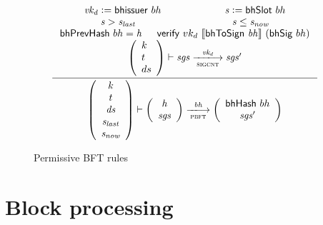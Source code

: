 \documentclass[11pt,a4paper]{article}
\newcommand{\var}[1]{\mathit{#1}}
\newcommand{\fun}[1]{\mathsf{#1}}
\newcommand{\type}[1]{\mathsf{#1}}
\newcommand{\trans}[2]{\xlongrightarrow[\textsc{#1}]{#2}}
\newcommand{\serialised}[1]{\llbracket \var{#1} \rrbracket}
\newcommand{\leteq}{\ensuremath{\mathrel{\mathop:}=}}
\newcommand{\verifyname}{verify}
\newcommand{\bhsigname}{bhSig}
\newcommand{\bhissuername}{bhissuer}
\newcommand{\verify}[3]{\fun{\verifyname} ~ #1 ~ #2 ~ #3}
\newcommand{\bhsig}[1]{\fun{\bhsigname} ~ #1}
\newcommand{\bhissuer}[1]{\fun{\bhissuername} ~ #1}
\begin{document}
\begin{figure}[ht]
  \begin{equation*}
    \inference
    {
      \var{vk_d} \leteq \bhissuer{bh} & \var{s} \leteq \bhslot{bh}
      \\ \var{s} > \var{s_{last}} & \var{s} \leq \var{s_{now}}
      \\ \bhprevhash{bh} = \var{h} & \verify{vk_d}{\serialised{\bhtosign{bh}}}{(\bhsig{bh})}
      \\
      {\left(
          \begin{array}{l}
            k\\
            t\\
            ds
          \end{array}
        \right)}
      \vdash
      \var{sgs} \trans{sigcnt}{\var{vk_d}} \var{sgs'}
      \\
    }
    {
      \left(
        {\begin{array}{c}
           k\\
           t\\
           \var{ds} \\
           \var{s_{last}} \\
           \var{s_{now}} \\
         \end{array}}
     \right)
     \vdash
     \left(
       {\begin{array}{c}
          \var{h} \\
          \var{sgs}
        \end{array}}
    \right)
    \trans{pbft}{\var{bh}}
    \left(
      {\begin{array}{c}
         \bhhash{bh} \\
         \var{sgs}'
       \end{array}}
   \right)
 }
\end{equation*}
\caption{Permissive BFT rules}
\label{fig:rules:pbft}
\end{figure}


\clearpage

\section{Block processing}
\label{sec:block-processing}

\newcommand{\BHEnv}{\type{BHEnv}}
\newcommand{\BHState}{\type{BHState}}

\newcommand{\BBEnv}{\type{BBEnv}}
\newcommand{\BBState}{\type{BBState}}
\end{document}
